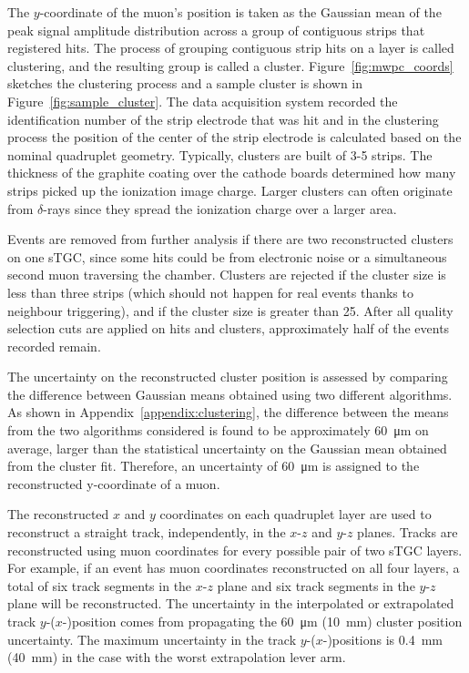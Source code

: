 The $y$-coordinate of the muon's position is taken as the Gaussian mean of the peak signal amplitude distribution across a group of contiguous strips that registered hits. The process of grouping contiguous strip hits on a layer is called clustering, and the resulting group is called a cluster. Figure~\ref{fig:mwpc_coords} sketches the clustering process and a sample cluster is shown in Figure~\ref{fig:sample_cluster}. The data acquisition system recorded the identification number of the strip electrode that was hit and in the clustering process the position of the center of the strip electrode is calculated based on the nominal quadruplet geometry. Typically, clusters are built of 3-5 strips. The thickness of the graphite coating over the cathode boards determined how many strips picked up the ionization image charge. Larger clusters can often originate from $\delta$-rays since they spread the ionization charge over a larger area.

Events are removed from further analysis if there are two reconstructed clusters on one sTGC, since some hits could be from electronic noise or a simultaneous second muon traversing the chamber. Clusters are rejected if the cluster size is less than three strips (which should not happen for real events thanks to neighbour triggering), and if the cluster size is greater than 25. After all quality selection cuts are applied on hits and clusters, approximately half of the events recorded remain.

The uncertainty on the reconstructed cluster position is assessed by comparing the difference between Gaussian means obtained using two different algorithms. As shown in Appendix~\ref{appendix:clustering}, the difference between the means from the two algorithms considered is found to be approximately \SI{60}{\micro\meter} on average, larger than the statistical uncertainty on the Gaussian mean obtained from the cluster fit. Therefore, an uncertainty of \SI{60}{\micro\meter} is assigned to the reconstructed y-coordinate of a muon. 

The reconstructed $x$ and $y$ coordinates on each quadruplet layer are used to reconstruct a straight track, independently, in the $x$-$z$ and $y$-$z$ planes. Tracks are reconstructed using muon coordinates for every possible pair of two sTGC layers.  For example, if an event has muon coordinates reconstructed on all four layers, a total of six track segments in the $x$-$z$ plane and six track segments in the $y$-$z$ plane will be reconstructed. The uncertainty in the interpolated or extrapolated track $y$-($x$-)position comes from propagating the \SI{60}{\micro\meter} (\SI{10}{mm}) cluster position uncertainty. The maximum uncertainty in the track $y$-($x$-)positions is \SI{0.4}{mm} (\SI{40}{mm}) in the case with the worst extrapolation lever arm. 

